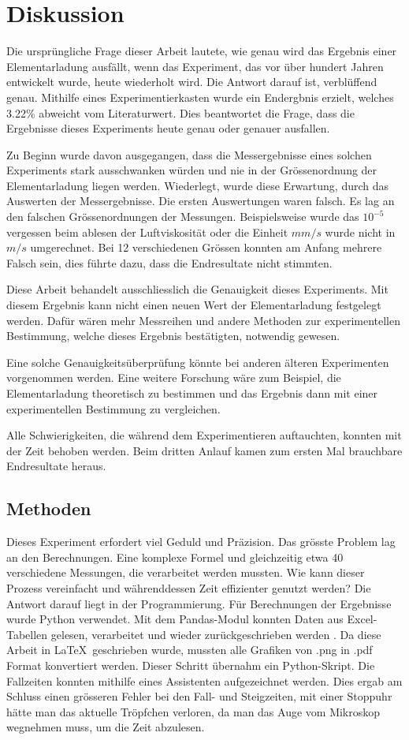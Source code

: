 \chapter{Diskussion}\label{cha:fazit}
Die ursprüngliche Frage dieser Arbeit lautete, wie genau wird das Ergebnis einer Elementarladung ausfällt, wenn das Experiment, das vor über hundert Jahren entwickelt wurde, heute wiederholt wird. Die Antwort darauf ist, verblüffend genau. Mithilfe eines Experimentierkasten wurde ein Endergbnis erzielt, welches 3.22\% abweicht vom Literaturwert. Dies beantwortet die Frage, dass die Ergebnisse dieses Experiments heute genau oder genauer ausfallen.

Zu Beginn wurde davon ausgegangen, dass die Messergebnisse eines solchen Experiments stark ausschwanken würden und nie in der Grössenordnung der Elementarladung liegen werden. Wiederlegt, wurde diese Erwartung, durch das Auswerten der Messergebnisse. Die ersten Auswertungen waren falsch. Es lag an den falschen Grössenordnungen der Messungen. Beispielsweise wurde das $10^{-5}$ vergessen beim ablesen der Luftviskosität oder die Einheit $mm/s$ wurde nicht in $m/s$ umgerechnet. Bei 12 verschiedenen Grössen konnten am Anfang mehrere Falsch sein, dies führte dazu, dass die Endresultate nicht stimmten.

Diese Arbeit behandelt ausschliesslich die Genauigkeit dieses Experiments. Mit diesem Ergebnis kann nicht einen neuen Wert der Elementarladung festgelegt werden. Dafür wären mehr Messreihen und andere Methoden zur experimentellen Bestimmung, welche dieses Ergebnis bestätigten, notwendig gewesen. 

Eine solche Genauigkeitsüberprüfung könnte bei anderen älteren Experimenten vorgenommen werden. Eine weitere Forschung wäre zum Beispiel, die Elementarladung theoretisch zu bestimmen und das Ergebnis dann mit einer experimentellen Bestimmung zu vergleichen.

Alle Schwierigkeiten, die während dem Experimentieren auftauchten, konnten mit der Zeit behoben werden. Beim dritten Anlauf kamen zum ersten Mal brauchbare Endresultate heraus. 

\section{Methoden}\label{sec:methoden}
Dieses Experiment erfordert viel Geduld und Präzision. Das grösste Problem lag an den Berechnungen. Eine komplexe Formel und gleichzeitig etwa 40 verschiedene Messungen, die verarbeitet werden mussten. Wie kann dieser Prozess vereinfacht und währenddessen Zeit effizienter genutzt werden? Die Antwort darauf liegt in der Programmierung. Für Berechnungen der Ergebnisse wurde Python verwendet. Mit dem Pandas-Modul konnten Daten aus Excel-Tabellen gelesen, verarbeitet und wieder zurückgeschrieben werden \parencite[vgl.]{Inc_2024}. 
Da diese Arbeit in \LaTeX~geschrieben wurde, mussten alle Grafiken von .png in .pdf Format konvertiert werden. Dieser Schritt übernahm ein Python-Skript. Die Fallzeiten konnten mithilfe eines Assistenten aufgezeichnet werden. Dies ergab am Schluss einen grösseren Fehler bei den Fall- und Steigzeiten, mit einer Stoppuhr hätte man das aktuelle Tröpfchen verloren, da man das Auge vom Mikroskop wegnehmen muss, um die Zeit abzulesen. 

